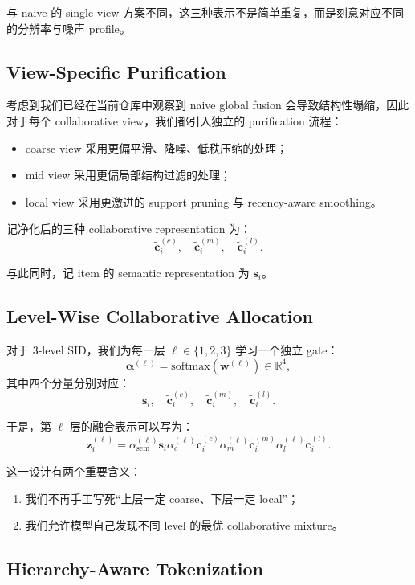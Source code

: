 \documentclass[11pt]{article}
\begin{document}
与 naive 的 single-view 方案不同，这三种表示不是简单重复，而是刻意对应不同的分辨率与噪声 profile。

\subsection{View-Specific Purification}

考虑到我们已经在当前仓库中观察到 naive global fusion 会导致结构性塌缩，因此对于每个 collaborative view，我们都引入独立的 purification 流程：
\begin{itemize}
  \item coarse view 采用更偏平滑、降噪、低秩压缩的处理；
  \item mid view 采用更偏局部结构过滤的处理；
  \item local view 采用更激进的 support pruning 与 recency-aware smoothing。
\end{itemize}

记净化后的三种 collaborative representation 为：
\[
\tilde{\mathbf{c}}_i^{(c)},\quad
\tilde{\mathbf{c}}_i^{(m)},\quad
\tilde{\mathbf{c}}_i^{(l)}.
\]

与此同时，记 item 的 semantic representation 为 $\mathbf{s}_i$。

\subsection{Level-Wise Collaborative Allocation}

对于 3-level SID，我们为每一层 $\ell \in \{1,2,3\}$ 学习一个独立 gate：
\[
\boldsymbol{\alpha}^{(\ell)} =
\mathrm{softmax}\!\left(\mathbf{w}^{(\ell)}\right)
\in \mathbb{R}^{4},
\]
其中四个分量分别对应：
\[
\mathbf{s}_i,\quad
\tilde{\mathbf{c}}_i^{(c)},\quad
\tilde{\mathbf{c}}_i^{(m)},\quad
\tilde{\mathbf{c}}_i^{(l)}.
\]

于是，第 $\ell$ 层的融合表示可以写为：
\[
\mathbf{z}_i^{(\ell)} =
\alpha_{\text{sem}}^{(\ell)} \mathbf{s}_i
 \alpha_{c}^{(\ell)} \tilde{\mathbf{c}}_i^{(c)}
 \alpha_{m}^{(\ell)} \tilde{\mathbf{c}}_i^{(m)}
 \alpha_{l}^{(\ell)} \tilde{\mathbf{c}}_i^{(l)}.
\]

这一设计有两个重要含义：
\begin{enumerate}
  \item 我们不再手工写死“上层一定 coarse、下层一定 local”；
  \item 我们允许模型自己发现不同 level 的最优 collaborative mixture。
\end{enumerate}

\subsection{Hierarchy-Aware Tokenization}
\end{document}
